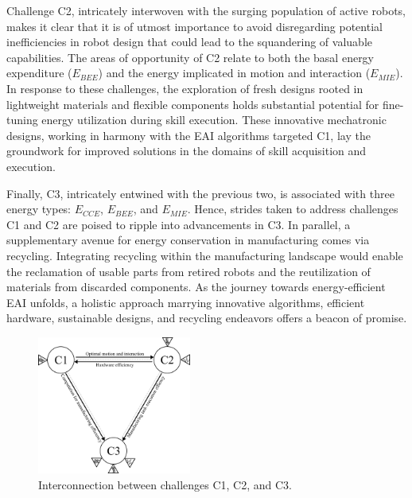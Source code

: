 \documentclass[12pt]{article}
\begin{document}
Challenge C2, intricately interwoven with the surging population of active robots, makes it clear that it is of utmost importance to avoid disregarding potential inefficiencies in robot design that could lead to the squandering of valuable capabilities. The areas of opportunity of C2 relate to both the basal energy expenditure ($E_{BEE}$) and the energy implicated in motion and interaction ($E_{MIE}$). In response to these challenges, the exploration of fresh designs rooted in lightweight materials and flexible components holds substantial potential for fine-tuning energy utilization during skill execution. These innovative mechatronic designs, working in harmony with the EAI algorithms targeted C1, lay the groundwork for improved solutions in the domains of skill acquisition and execution.

Finally, C3, intricately entwined with the previous two, is associated with three energy types: $E_{CCE}$, $E_{BEE}$, and $E_{MIE}$. Hence, strides taken to address challenges C1 and C2 are poised to ripple into advancements in C3. In parallel, a supplementary avenue for energy conservation in manufacturing comes via recycling. Integrating recycling within the manufacturing landscape would enable the reclamation of usable parts from retired robots and the reutilization of materials from discarded components. As the journey towards energy-efficient EAI unfolds, a holistic approach marrying innovative algorithms, efficient hardware, sustainable designs, and recycling endeavors offers a beacon of promise.
\begin{figure}[!t]
	\centering
	\includegraphics[width=0.45\textwidth]{fig/grand_challenges_connections.png}
	\caption{Interconnection between challenges C1, C2, and C3.}
	\label{fig:challengesConnected}
\end{figure}

\end{document}
